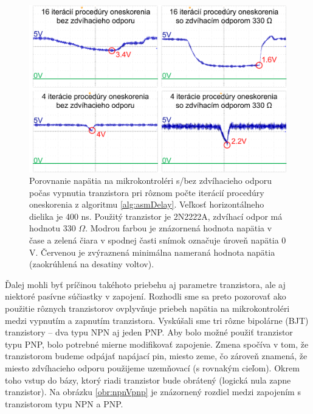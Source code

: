 \begin{figure}
    \centerline{\includegraphics[width=1\textwidth]{images/vccAnalysis.png}}
    \caption[Porovnanie napätia na mikrokontroléri s/bez zdvíhacieho odporu]{Porovnanie napätia na mikrokontroléri s/bez zdvíhacieho odporu počas vypnutia tranzistora pri rôznom počte iterácií procedúry oneskorenia z algoritmu \ref{alg:asmDelay}. Veľkosť horizontálneho dielika je 400 ns. Použitý tranzistor je 2N2222A, zdvíhací odpor má hodnotu 330 $\Omega$. Modrou farbou je znázornená hodnota napätia v čase a zelená čiara v spodnej časti snímok označuje úroveň napätia 0 V. Červenou je zvýraznená minimálna nameraná hodnota napätia (zaokrúhlená na desatiny voltov).}
    \label{obr:vccAnalysis}
\end{figure}

Ďalej mohli byť príčinou takéhoto priebehu aj parametre tranzistora, ale aj niektoré pasívne súčiastky v zapojení. Rozhodli sme sa preto pozorovať ako použitie rôznych tranzistorov ovplyvňuje priebeh napätia na mikrokontroléri medzi vypnutím a zapnutím tranzistora. Vyskúšali sme tri rôzne bipolárne (BJT) tranzistory -- dva typu NPN aj jeden PNP. Aby bolo možné použiť tranzistor typu PNP, bolo potrebné mierne modifikovať zapojenie. Zmena spočíva v tom, že tranzistorom budeme odpájať napájací pin, miesto zeme, čo zároveň znamená, že miesto zdvíhacieho odporu použijeme uzemňovací (s rovnakým cieľom). Okrem toho vstup do bázy, ktorý riadi tranzistor bude obrátený (logická nula zapne tranzistor). Na obrázku \ref{obr:npnVpnp} je znázornený rozdiel medzi zapojením s tranzistorom typu NPN a PNP.

